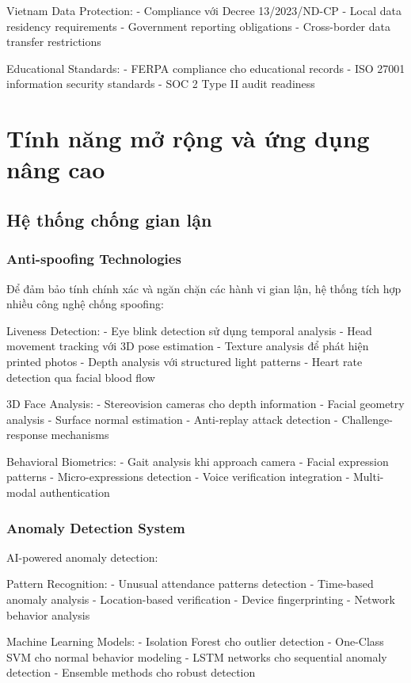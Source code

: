\documentclass[12pt,a4paper]{report}
\begin{document}
Vietnam Data Protection:
- Compliance với Decree 13/2023/ND-CP
- Local data residency requirements
- Government reporting obligations
- Cross-border data transfer restrictions

Educational Standards:
- FERPA compliance cho educational records
- ISO 27001 information security standards
- SOC 2 Type II audit readiness

\chapter{Tính năng mở rộng và ứng dụng nâng cao}
\section{Hệ thống chống gian lận}
\subsection{Anti-spoofing Technologies}
Để đảm bảo tính chính xác và ngăn chặn các hành vi gian lận, hệ thống tích hợp nhiều công nghệ chống spoofing:

Liveness Detection:
- Eye blink detection sử dụng temporal analysis
- Head movement tracking với 3D pose estimation
- Texture analysis để phát hiện printed photos
- Depth analysis với structured light patterns
- Heart rate detection qua facial blood flow

3D Face Analysis:
- Stereovision cameras cho depth information
- Facial geometry analysis
- Surface normal estimation
- Anti-replay attack detection
- Challenge-response mechanisms

Behavioral Biometrics:
- Gait analysis khi approach camera
- Facial expression patterns
- Micro-expressions detection
- Voice verification integration
- Multi-modal authentication

\subsection{Anomaly Detection System}
AI-powered anomaly detection:

Pattern Recognition:
- Unusual attendance patterns detection
- Time-based anomaly analysis
- Location-based verification
- Device fingerprinting
- Network behavior analysis

Machine Learning Models:
- Isolation Forest cho outlier detection
- One-Class SVM cho normal behavior modeling
- LSTM networks cho sequential anomaly detection
- Ensemble methods cho robust detection
\end{document}
